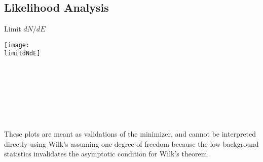 \documentclass[titlepage]{article}
\begin{document}
\subsection{Likelihood Analysis}
\results
\pagebreak

\backgroundpdfplot

\survivialfunctionplot

\pagebreak
{
  \centering

  {\Large Limit $dN/dE$}

  \texttt{[image: \\limitdNdE]}
  \\
  \\

  \tsd

  \\
  \\
  \upperlim

  \\
  \\
  \nsscan
  
  These plots are meant as validations of the minimizer, and cannot be interpreted directly using Wilk's assuming one degree of freedom because the low background statistics invalidates the asymptotic condition for Wilk's theorem.
}

\vfill        
\end{document}
